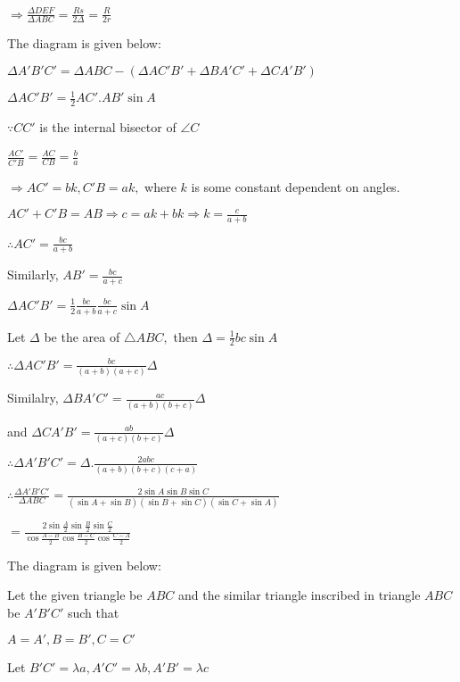   $\Rightarrow \frac{\Delta DEF}{\Delta ABC} = \frac{Rs}{2\Delta} = \frac{R}{2r}$

\item The diagram is given below:

  \startplacefigure
    \externalfigure[21_6.pdf]
  \stopplacefigure

  $\Delta A'B'C' = \Delta ABC - (\Delta AC'B' + \Delta BA'C' + \Delta CA'B')$

  $\Delta AC'B' = \frac{1}{2}AC'.AB'\sin A$

  $\because CC'$ is the internal bisector of $\angle C$

  $\frac{AC'}{C'B} = \frac{AC}{CB} = \frac{b}{a}$

  $\Rightarrow AC' = bk, C'B = ak,$ where $k$ is some constant dependent on angles.

  $AC' + C'B = AB \Rightarrow c = ak + bk \Rightarrow k = \frac{c}{a + b}$

  $\therefore AC' = \frac{bc}{a + b}$

  Similarly, $AB' = \frac{bc}{a + c}$

  $\Delta AC'B' = \frac{1}{2}\frac{bc}{a + b}\frac{bc}{a + c}\sin A$

  Let $\Delta$ be the area of $\triangle ABC,$ then $\Delta = \frac{1}{2}bc\sin A$

  $\therefore \Delta AC'B' = \frac{bc}{(a + b)(a + c)}\Delta$

  Similalry, $\Delta BA'C' = \frac{ac}{(a + b)(b + c)}\Delta$

  and $\Delta CA'B' = \frac{ab}{(a + c)(b + c)}\Delta$

  $\therefore \Delta A'B'C' = \Delta.\frac{2abc}{(a + b)(b + c)(c + a)}$

  $\therefore \frac{\Delta A'B'C'}{\Delta ABC} = \frac{2\sin A\sin B\sin C}{(\sin A + \sin B)(\sin B + \sin C)(\sin C + \sin A)}$

  $= \frac{2\sin\frac{A}{2}\sin\frac{B}{2}\sin\frac{C}{2}}{\cos\frac{A - B}{2}\cos\frac{B - C}{2}\cos\frac{C - A}{2}}$

\item The diagram is given below:

  \startplacefigure
    \externalfigure[21_7.pdf]
  \stopplacefigure

  Let the given triangle be $ABC$ and the similar triangle inscribed in triangle $ABC$ be $A'B'C'$ such that

  $A=A', B=B', C=C'$

  Let $B'C'=\lambda a, A'C'=\lambda b, A'B' = \lambda c$

